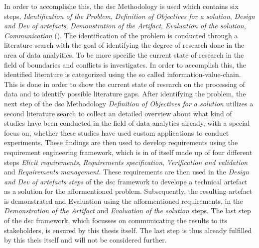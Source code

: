 In order to accomplishe this, the \ac{dsc} Methodology is used which contains six steps, \textit{Identification of the Problem}, \textit{Definition of Objectives for a solution}, \textit{Design and Dev of artefacts}, \textit{Demonstration of the Artifact}, \textit{Evaluation of the solution}, \textit{Communication} (\cite{Peffers.2006}). The identification of the problem is conducted through a literature search with the goal of identifying the degree of research done in the area of data analyitics. To be more specific the current state of research in the field of boundaries and conflicts is investigates. In order to accomplish this, the identified literature is categorized using the so called information-value-chain. This is done in order to show the current state of research on the processing of data and to identify possible literature gaps. After identifying the problem, the next step of the \ac{dsc} Methodology \textit{Definition of Objectives for a solution} utilizes a second literature search to collect an detailed overview about what kind of studies have been conducted in the field of data analytics already, with a special focus on, whether these studies have used custom applications to conduct experiments. These findings are then used to develop requirements using the requirement engineering framework, which is in of itself made up of four different steps \textit{Elicit requirements}, \textit{Requirements specification}, \textit{Verification and validation} and \textit{Requirements management}. These requirements are then used in the \textit{Design and Dev of artefacts steps} of the \ac{dsc} framework to develope a technical artefact as a solution for the afformentioned problem. Subsequently, the resulting artefact is demonstrated and Evaluation using the afformentioned requirements, in the \textit{Demonstration of the Artifact} and \textit{Evaluation of the solution} steps. The last step of the \ac{dsc} framework, which focusses on communicating the results to its stakeholders, is ensured by this thesis itself. The last step is thus already fulfilled by this theis itself and will not be considered further.




